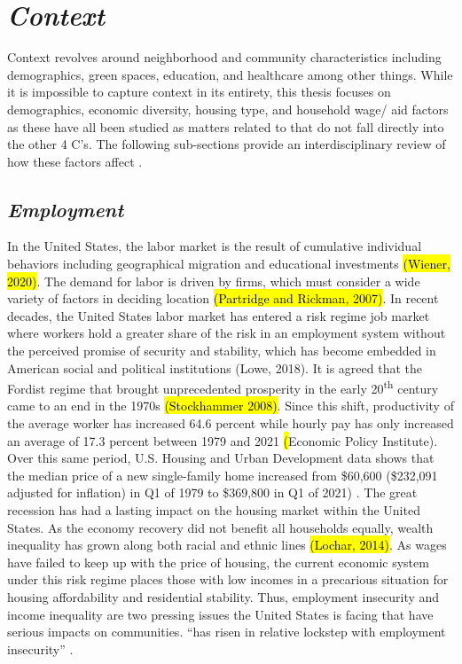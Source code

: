\section{\textit{Context}}

Context revolves around neighborhood and community characteristics including demographics, green spaces, education, and healthcare among other things. While it is impossible to capture context in its entirety, this thesis focuses on demographics, economic diversity, housing type, and household wage/ aid factors as these have all been studied as matters related to \hs that do not fall directly into the other 4 C’s. The following sub-sections provide an interdisciplinary review of how these factors affect \hs.  

\subsection{\textit{Employment}}

In the United States, the labor market is the result of cumulative individual behaviors including geographical migration and educational investments \hl{(Wiener, 2020)}. The demand for labor is driven by firms, which must consider a wide variety of factors in deciding location \hl{(Partridge and Rickman, 2007)}. In recent decades, the United States labor market has entered a risk regime job market where workers hold a greater share of the risk in an employment system without the perceived promise of security and stability, which has become embedded in American social and political institutions (Lowe, 2018). It is agreed that the Fordist regime that brought unprecedented prosperity in the early 20\textsuperscript{th} century came to an end in the 1970s \hl{(Stockhammer 2008)}. Since this shift, productivity of the average worker has increased 64.6 percent while hourly pay has only increased an average of 17.3 percent between 1979 and 2021 \hl(Economic Policy Institute). Over this same period, U.S. Housing and Urban Development data shows that the median price of a new single-family home increased from \$60,600 (\$232,091 adjusted for inflation) in Q1 of 1979 to \$369,800 in Q1 of 2021) \citep{us_census_bureau_median_1963}. The great recession has had a lasting impact on the housing market within the United States. As the economy recovery did not benefit all households equally, wealth inequality has grown along both racial and ethnic lines \hl{(Lochar, 2014)}. As wages have failed to keep up with the price of housing, the current economic system under this risk regime places those with low incomes in a precarious situation for housing affordability and residential stability. Thus, employment insecurity and income inequality are two pressing issues the United States is facing that have serious impacts on communities. “\hs has risen in relative lockstep with employment insecurity” \citep[48]{desmond_housing_2016-1}. 

